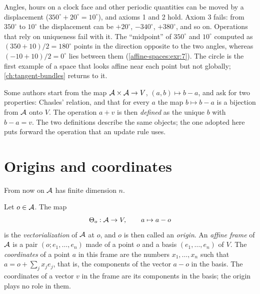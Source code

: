 \begin{notechapter}
\begin{pitfall}
Angles, hours on a clock face and other periodic quantities can be moved by
a displacement ($350^\circ + 20^\circ = 10^\circ$), and axioms 1 and 2 hold.
Axiom 3 fails: from $350^\circ$ to $10^\circ$ the displacement can be
$+20^\circ$, $-340^\circ$, $+380^\circ$, and so on. Operations that rely on
uniqueness fail with it. The ``midpoint'' of $350^\circ$ and $10^\circ$
computed as $(350 + 10)/2 = 180^\circ$ points in the direction opposite to
the two angles, whereas $(-10 + 10)/2 = 0^\circ$ lies between them
(\cref{affine-spaces:exr:7}). The circle is the first example of a space
that looks affine near each point but not globally;
\cref{ch:tangent-bundles} returns to it.
\end{pitfall}

\begin{remark}
Some authors start from the map $\mathcal{A}\times\mathcal{A}\to V$, $(a, b)\mapsto b - a$,
and ask for two properties: Chasles' relation, and that for every $a$ the
map $b\mapsto b - a$ is a bijection from $\mathcal{A}$ onto $V$. The operation
$a + v$ is then \emph{defined} as the unique $b$ with $b - a = v$. The two
definitions describe the same objects; the one adopted here puts forward
the operation that an update rule uses.
\end{remark}

\section{Origins and coordinates}\label{affine-spaces:sec:coordinates}

From now on $\mathcal{A}$ has finite dimension $n$.

\begin{definition}
\label{affine-spaces:def:frame}
Let $o\in\mathcal{A}$. The map
\[
  \Theta_o:\mathcal{A}\to V,\qquad a\mapsto a - o
\]
is the \emph{vectorialization} of $\mathcal{A}$ at $o$, and $o$ is then called an
\emph{origin}. An \emph{affine frame} of $\mathcal{A}$ is a pair
$(o; e_1,\dots,e_n)$ made of a point $o$ and a basis $(e_1,\dots,e_n)$ of
$V$. The \emph{coordinates} of a point $a$ in this frame are the numbers
$x_1,\dots,x_n$ such that $a = o + \sum_jx_je_j$, that is, the components
of the vector $a - o$ in the basis. The coordinates of a vector $v$ in the
frame are its components in the basis; the origin plays no role in them.
\end{definition}


\end{notechapter}
